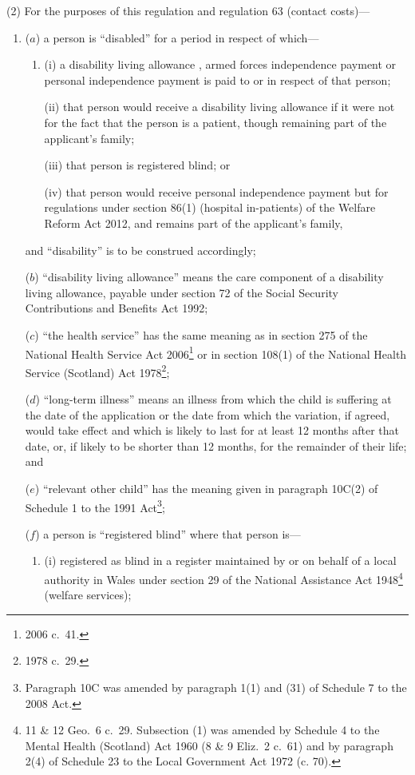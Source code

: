 \documentclass[12pt,a4paper]{article}
\begin{document}
(2) For the purposes of this regulation and regulation 63 (contact costs)—
\begin{enumerate}\item[]
($a$) a person is “disabled” for a period in respect of which—
\begin{enumerate}\item[]
(i) a disability living allowance%
, armed forces independence payment  %
or personal independence payment  %
is paid to or in respect of that person;

(ii) that person would receive a disability living allowance if it were not for the fact that the person is a patient, though remaining part of the applicant’s family; 

(iii) that person is registered blind;
%
or

(iv) that person would receive personal independence payment but for regulations under section 86(1) (hospital in-patients) of the Welfare Reform Act 2012, and remains part of the applicant’s family,
\end{enumerate}
and “disability” is to be construed accordingly;

($b$) “disability living allowance” means the care component of a disability living allowance, payable under section 72 of the Social Security Contributions and Benefits Act 1992;

($c$) “the health service” has the same meaning as in section 275 of the National Health Service Act 2006\footnote{2006 c.~41.} or in section 108(1) of the National Health Service (Scotland) Act 1978\footnote{1978 c.~29.};

($d$) “long-term illness” means an illness from which the child is suffering at the date of the application or the date from which the variation, if agreed, would take effect and which is likely to last for at least 12 months after that date, or, if likely to be shorter than 12 months, for the remainder of their life; and

($e$) “relevant other child” has the meaning given in paragraph 10C(2) of Schedule 1 to the 1991 Act\footnote{Paragraph 10C was amended by paragraph 1(1) and (31) of Schedule 7 to the 2008 Act.};

($f$) a person is “registered blind” where that person is—
\begin{enumerate}\item[]
(i) registered as blind in a register maintained by or on behalf of a local authority in 
Wales under section 29 of the National Assistance Act 1948\footnote{11 \& 12 Geo.~6 c.~29. Subsection (1) was amended by Schedule 4 to the Mental Health (Scotland) Act 1960 (8 \& 9 Eliz.~2 c.~61) and by paragraph 2(4) of Schedule 23 to the Local Government Act 1972 (c. 70).} (welfare services); 


\end{enumerate}
\end{enumerate}
\end{document}
